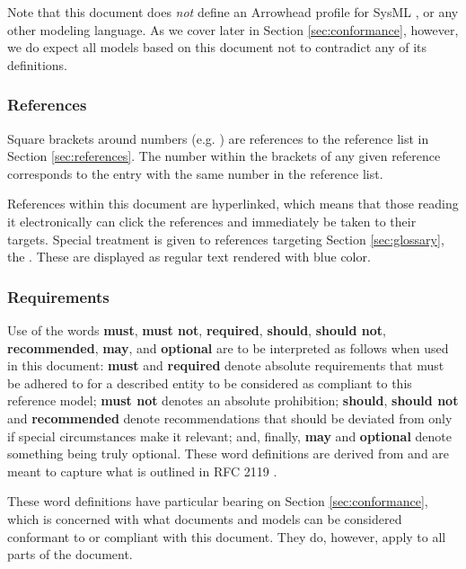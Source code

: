Note that this document does \textit{not} define an Arrowhead profile for SysML \cite{omg2019sysml}, or any other modeling language.
As we cover later in Section \ref{sec:conformance}, however, we do expect all models based on this document not to contradict any of its definitions.

\subsubsection{References}

Square brackets around numbers (e.g. \cite{delsing2017iot}) are references to the reference list in Section \ref{sec:references}.
The number within the brackets of any given reference corresponds to the entry with the same number in the reference list.

References within this document are hyperlinked, which means that those reading it electronically can click the references and immediately be taken to their targets.
Special treatment is given to references targeting Section \ref{sec:glossary}, the .
These are displayed as regular text rendered with blue color.

\subsubsection{Requirements}

Use of the words \textbf{must}, \textbf{must not}, \textbf{required}, \textbf{should}, \textbf{should not}, \textbf{recommended}, \textbf{may}, and \textbf{optional} are to be interpreted as follows when used in this document: \textbf{must} and \textbf{required} denote absolute requirements that must be adhered to for a described entity to be considered as compliant to this reference model; \textbf{must not} denotes an absolute prohibition; \textbf{should}, \textbf{should not} and \textbf{recommended} denote recommendations that should be deviated from only if special circumstances make it relevant; and, finally, \textbf{may} and \textbf{optional} denote something being truly optional.
These word definitions are derived from and are meant to capture what is outlined in RFC 2119 \cite{bradner1997keywords}.

These word definitions have particular bearing on Section \ref{sec:conformance}, which is concerned with what documents and models can be considered conformant to or compliant with this document.
They do, however, apply to all parts of the document.

